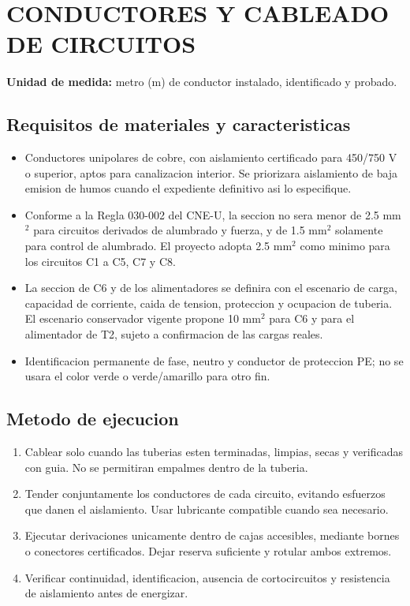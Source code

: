 \section{CONDUCTORES Y CABLEADO DE CIRCUITOS}

\textbf{Unidad de medida:} metro (m) de conductor instalado, identificado y probado.

\subsection{Requisitos de materiales y caracteristicas}
\begin{itemize}
  \item Conductores unipolares de cobre, con aislamiento certificado para 450/750 V o
  superior, aptos para canalizacion interior. Se priorizara aislamiento de baja emision
  de humos cuando el expediente definitivo asi lo especifique.
  \item Conforme a la Regla 030-002 del CNE-U, la seccion no sera menor de
  2.5 mm\(^2\) para circuitos derivados de alumbrado y fuerza, y de 1.5 mm\(^2\)
  solamente para control de alumbrado. El proyecto adopta 2.5 mm\(^2\) como minimo
  para los circuitos C1 a C5, C7 y C8.
  \item La seccion de C6 y de los alimentadores se definira con el escenario de carga,
  capacidad de corriente, caida de tension, proteccion y ocupacion de tuberia. El
  escenario conservador vigente propone 10 mm\(^2\) para C6 y para el alimentador de
  T2, sujeto a confirmacion de las cargas reales.
  \item Identificacion permanente de fase, neutro y conductor de proteccion PE; no se
  usara el color verde o verde/amarillo para otro fin.
\end{itemize}

\subsection{Metodo de ejecucion}
\begin{enumerate}
  \item Cablear solo cuando las tuberias esten terminadas, limpias, secas y verificadas
  con guia. No se permitiran empalmes dentro de la tuberia.
  \item Tender conjuntamente los conductores de cada circuito, evitando esfuerzos que
  danen el aislamiento. Usar lubricante compatible cuando sea necesario.
  \item Ejecutar derivaciones unicamente dentro de cajas accesibles, mediante bornes o
  conectores certificados. Dejar reserva suficiente y rotular ambos extremos.
  \item Verificar continuidad, identificacion, ausencia de cortocircuitos y resistencia
  de aislamiento antes de energizar.
\end{enumerate}

